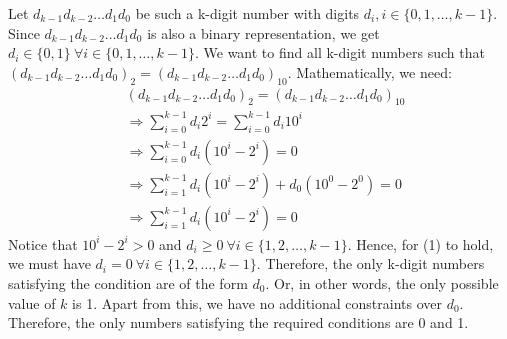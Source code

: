 \documentclass{article}
\begin{document}
  Let $d_{k-1} d_{k-2} \dots d_1 d_0$ be such a k-digit number with digits $d_i, i \in \{0, 1, \dots, k-1\}$.
  Since $d_{k-1} d_{k-2} \dots d_1 d_0$ is also a binary representation, we get $d_i \in \{0, 1\} ~ \forall i \in \{0, 1, \dots, k-1\}$.
  We want to find all k-digit numbers such that $(d_{k-1} d_{k-2} \dots d_1 d_0)_2 = (d_{k-1} d_{k-2} \dots d_1 d_0)_{10}$.
  Mathematically, we need:
  \begin{align*}
    &(d_{k-1} d_{k-2} \dots d_1 d_0)_2 = (d_{k-1} d_{k-2} \dots d_1 d_0)_{10} \\
    &\Rightarrow \sum_{i=0}^{k-1} d_i 2^i = \sum_{i=0}^{k-1} d_i 10^i \\
    &\Rightarrow \sum_{i=0}^{k-1} d_i (10^i - 2^i) = 0 \\
    &\Rightarrow \sum_{i=1}^{k-1} d_i (10^i - 2^i) + d_0 (10^0 - 2^0) = 0 \\
    &\Rightarrow \sum_{i=1}^{k-1} d_i (10^i - 2^i) = 0 \tag{1}
  \end{align*}
  Notice that $10^i - 2^i > 0$ and $d_i \geq 0 ~ \forall i \in \{1, 2, \dots, k-1\}$.
  Hence, for (1) to hold, we must have $d_i = 0 ~ \forall i \in \{1, 2, \dots, k-1\}$.
  Therefore, the only k-digit numbers satisfying the condition are of the form $d_0$.
  Or, in other words, the only possible value of $k$ is 1.
  Apart from this, we have no additional constraints over $d_0$.
  Therefore, the only numbers satisfying the required conditions are 0 and 1.
\end{document}
